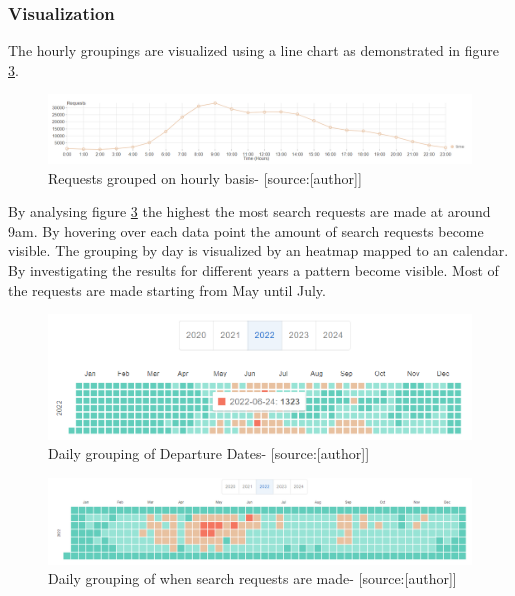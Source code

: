\subsubsection{Visualization}
The hourly groupings are visualized using a line chart as demonstrated in figure \ref{fig:hourly_grouping}.
\begin{figure}[H]
	\centering
		\includegraphics[width=15cm]{images/requests_hour}
	\caption{Requests grouped on hourly basis- [source:[author]]}
	\label{fig:hourly_grouping}
\end{figure}
By analysing figure \ref{fig:hourly_grouping} the highest the most search requests are made at around 9am. By hovering over each data point the amount of search requests become visible. 
\newline
The grouping by day is visualized by an heatmap mapped to an calendar. By investigating the results for different years a pattern become visible. Most of the requests are made starting from May until July. 
\begin{figure}[H]
	\centering
		\includegraphics[width=15cm]{images/grouping_by_taskFrom}
	\caption{Daily grouping of Departure Dates- [source:[author]]}
	\label{fig:hourly_grouping}
\end{figure}

\begin{figure}[H]
	\centering
		\includegraphics[width=15cm]{images/grouping_by_created_at}
	\caption{Daily grouping of when search requests are made- [source:[author]]}
	\label{fig:hourly_grouping}
\end{figure}

